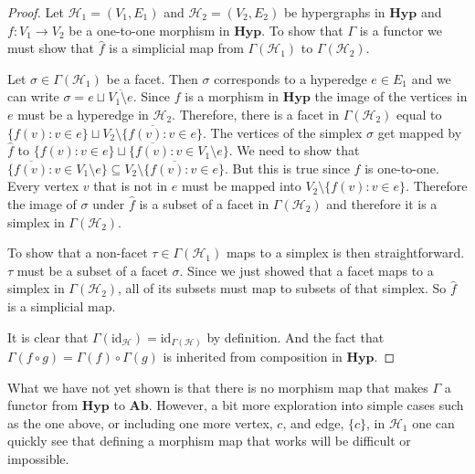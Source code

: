 \documentclass{amsart}
\newcommand{\Ab}{\mathrm{\textbf{Ab}}}
\newcommand{\Hyp}{\mathrm{\textbf{Hyp}}}
\renewcommand{\H}{\mathcal{H}}
\newcommand{\pol}{\Gamma}
\newcommand{\cEP}[1]{{\textcolor{blue}{[Comment from Emilie: #1]}}}
\begin{document}
\begin{proof}
Let $\H_1=(V_1, E_1)$ and $\H_2=(V_2, E_2)$ be hypergraphs in $\Hyp$ and $f : V_1 \rightarrow V_2$ be a one-to-one morphism in $\Hyp$. To show that $\pol$ is a functor we must show that $\hat{f}$ is a simplicial map from $\Gamma(\H_1)$ to $\Gamma(\H_2)$.

Let $\sigma \in \pol(\H_1)$ be a facet. Then $\sigma$ corresponds to a hyperedge $e \in E_1$ and we can write $\sigma = e \sqcup \overline{V_1\setminus e}$.
Since $f$ is a morphism in $\Hyp$ the image of the vertices in $e$ must be a hyperedge in $\H_2$. Therefore, there is a facet in $\pol(\H_2)$ equal to $\{f(v) : v \in e\} \sqcup \overline{V_2 \setminus \{f(v) : v \in e\}}$. 
The vertices of the simplex $\sigma$ get mapped by $\hat{f}$ to $\{f(v) : v \in e\} \sqcup \{\overline{f(v)} : v \in V_1 \setminus e\}$. 
We need to show that $\{\overline{f(v)} : v \in V_1 \setminus e\} \subseteq  \overline{V_2 \setminus \{f(v) : v \in e\}}$.
But this is true since $f$ is one-to-one. Every vertex $v$ that is not in $e$ must be mapped into $V_2 \setminus \{f(v) : v \in e\}$.
Therefore the image of $\sigma$ under $\hat{f}$ is a subset of a facet in $\pol(\H_2)$ and therefore it is a simplex in $\pol(\H_2)$.

To show that a non-facet $\tau \in \pol(\H_1)$ maps to a simplex is then straightforward. $\tau$ must be a subset of a facet $\sigma$. Since we just showed that a facet maps to a simplex in $\pol(\H_2)$, all of its subsets must map to subsets of that simplex.
So $\hat{f}$ is a simplicial map. 

It is clear that $\Gamma(\textrm{id}_\H) = \textrm{id}_{\Gamma(\H)}$ by definition. And the fact that $\Gamma(f\circ g) = \Gamma(f)\circ\Gamma(g)$ is inherited from composition in $\Hyp$. 
\end{proof}

What we have not yet shown is that there is no morphism map that makes $\Gamma$ a functor from $\Hyp$ to $\Ab$. However, a bit more exploration into simple cases such as the one above, or including one more vertex, $c$, and edge, $\{c\}$, in $\H_1$ one can quickly see that defining a morphism map that works will be difficult or impossible.
\end{document}
